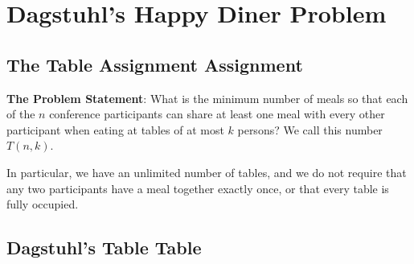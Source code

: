\documentclass[a4paper]{article}
\begin{document}
\section{Dagstuhl's Happy Diner
Problem}\label{dagstuhls-happy-diner-problem}

\subsection{The Table Assignment
Assignment}\label{the-table-assignment-assignment}

\textbf{The Problem Statement}: What is the minimum number of meals so
that each of the $n$ conference participants can share at least
one meal with every other participant when eating at tables of at most
$k$ persons? We call this number $T(n,k)$.

In particular, we have an unlimited number of tables, and we do not
require that any two participants have a meal together exactly once, or
that every table is fully occupied.

\subsection{Dagstuhl's Table Table}\label{dagstuhls-table-table}
\end{document}
